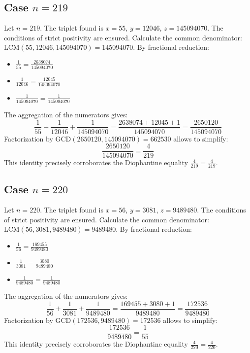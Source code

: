 \documentclass[11pt,a4paper]{article}
\begin{document}
\subsection{Case $n = 219$}
Let $n = 219$. The triplet found is $x = 55$, $y = 12046$, $z = 145094070$.
The conditions of strict positivity are ensured.
Calculate the common denominator: $\text{LCM}(55, 12046, 145094070) = 145094070$.
By fractional reduction:
\begin{itemize}
    \item $\frac{1}{55} = \frac{2638074}{145094070}$
    \item $\frac{1}{12046} = \frac{12045}{145094070}$
    \item $\frac{1}{145094070} = \frac{1}{145094070}$
\end{itemize}
The aggregation of the numerators gives:
$$ \frac{1}{55} + \frac{1}{12046} + \frac{1}{145094070} = \frac{2638074 + 12045 + 1}{145094070} = \frac{2650120}{145094070} $$
Factorization by $\text{GCD}(2650120, 145094070) = 662530$ allows to simplify:
$$ \frac{2650120}{145094070} = \frac{4}{219} $$
This identity precisely corroborates the Diophantine equality $\frac{4}{219} = \frac{4}{219}$.

\subsection{Case $n = 220$}
Let $n = 220$. The triplet found is $x = 56$, $y = 3081$, $z = 9489480$.
The conditions of strict positivity are ensured.
Calculate the common denominator: $\text{LCM}(56, 3081, 9489480) = 9489480$.
By fractional reduction:
\begin{itemize}
    \item $\frac{1}{56} = \frac{169455}{9489480}$
    \item $\frac{1}{3081} = \frac{3080}{9489480}$
    \item $\frac{1}{9489480} = \frac{1}{9489480}$
\end{itemize}
The aggregation of the numerators gives:
$$ \frac{1}{56} + \frac{1}{3081} + \frac{1}{9489480} = \frac{169455 + 3080 + 1}{9489480} = \frac{172536}{9489480} $$
Factorization by $\text{GCD}(172536, 9489480) = 172536$ allows to simplify:
$$ \frac{172536}{9489480} = \frac{1}{55} $$
This identity precisely corroborates the Diophantine equality $\frac{4}{220} = \frac{4}{220}$.
\end{document}
